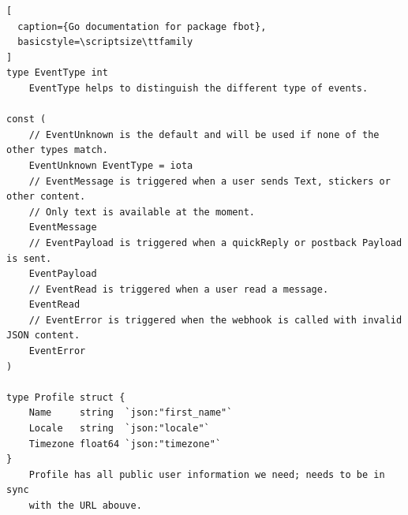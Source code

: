 \begin{lstlisting}[
  caption={Go documentation for package fbot},
  basicstyle=\scriptsize\ttfamily
]
type EventType int
    EventType helps to distinguish the different type of events.

const (
    // EventUnknown is the default and will be used if none of the other types match.
    EventUnknown EventType = iota
    // EventMessage is triggered when a user sends Text, stickers or other content.
    // Only text is available at the moment.
    EventMessage
    // EventPayload is triggered when a quickReply or postback Payload is sent.
    EventPayload
    // EventRead is triggered when a user read a message.
    EventRead
    // EventError is triggered when the webhook is called with invalid JSON content.
    EventError
)

type Profile struct {
    Name     string  `json:"first_name"`
    Locale   string  `json:"locale"`
    Timezone float64 `json:"timezone"`
}
    Profile has all public user information we need; needs to be in sync
    with the URL abouve.
\end{lstlisting}


